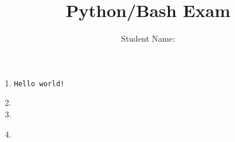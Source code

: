 \documentclass[11pt]{article}
\title{Python/Bash Exam}
\author{Student Name: \blank{12em}}
\newcommand{\blank}[1]{\underline{\hspace*{#1}}}
\newcommand{\code}[1]{{\color{darkred}\texttt{#1}}}
\begin{document}
\maketitle
\begin{spacing}{1.2}

\begin{enumerate}[label=\bfseries Question \arabic*:]
	\item  \code{Hello world!}
	\item 
	\item 
	\item 
		\blank{\textwidth} \\
		\blank{\textwidth}
\end{enumerate}

\end{spacing}
\end{document}
